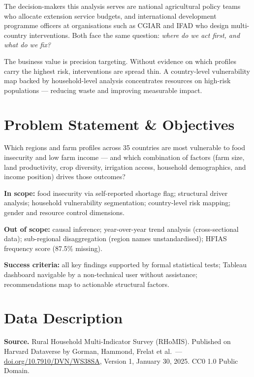 \documentclass[11pt,a4paper]{article}
\begin{document}
The decision-makers this analysis serves are national agricultural policy teams who allocate extension service budgets, and international development programme officers at organisations such as CGIAR and IFAD who design multi-country interventions. Both face the same question: \textit{where do we act first, and what do we fix?}

The business value is precision targeting. Without evidence on which profiles carry the highest risk, interventions are spread thin. A country-level vulnerability map backed by household-level analysis concentrates resources on high-risk populations — reducing waste and improving measurable impact.

\section{Problem Statement \& Objectives}

\begin{findingbox}
Which regions and farm profiles across 35 countries are most vulnerable to food insecurity and low farm income — and which combination of factors (farm size, land productivity, crop diversity, irrigation access, household demographics, and income position) drives those outcomes?
\end{findingbox}

\textbf{In scope:} food insecurity via self-reported shortage flag; structural driver analysis; household vulnerability segmentation; country-level risk mapping; gender and resource control dimensions.

\textbf{Out of scope:} causal inference; year-over-year trend analysis (cross-sectional data); sub-regional disaggregation (region names unstandardised); HFIAS frequency score (87.5\% missing).

\textbf{Success criteria:} all key findings supported by formal statistical tests; Tableau dashboard navigable by a non-technical user without assistance; recommendations map to actionable structural factors.

\section{Data Description}

\textbf{Source.} Rural Household Multi-Indicator Survey (RHoMIS). Published on Harvard Dataverse by Gorman, Hammond, Frelat et al.\ — \href{https://doi.org/10.7910/DVN/WS38SA}{doi.org/10.7910/DVN/WS38SA}, Version 1, January 30, 2025. CC0 1.0 Public Domain.
\end{document}

